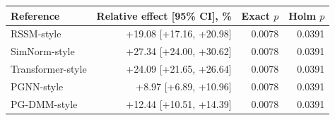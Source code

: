 \begin{tabular}{lrrr}
\toprule
Reference & Relative effect [95\% CI], \% & Exact $p$ & Holm $p$ \\
\midrule
RSSM-style & +19.08 [+17.16, +20.98] & 0.0078 & 0.0391 \\
SimNorm-style & +27.34 [+24.00, +30.62] & 0.0078 & 0.0391 \\
Transformer-style & +24.09 [+21.65, +26.64] & 0.0078 & 0.0391 \\
PGNN-style & +8.97 [+6.89, +10.96] & 0.0078 & 0.0391 \\
PG-DMM-style & +12.44 [+10.51, +14.39] & 0.0078 & 0.0391 \\
\bottomrule
\end{tabular}
